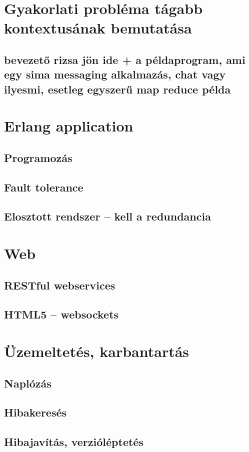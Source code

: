 \documentclass[12pt, a4paper, oneside]{book}
\begin{document}
\chapter{Gyakorlati probléma tágabb kontextusának bemutatása}
\section{bevezető rizsa jön ide + a példaprogram, ami egy sima messaging
alkalmazás, chat vagy ilyesmi, esetleg egyszerű map reduce példa}

\chapter{Erlang application}
\section{Programozás}
\section{Fault tolerance}
\section{Elosztott rendszer -- kell a redundancia}

\chapter{Web}
\section{RESTful webservices}
\section{HTML5 -- websockets}

\chapter{Üzemeltetés, karbantartás}
\section{Naplózás}
\section{Hibakeresés}
\section{Hibajavítás, verzióléptetés}
\end{document}

